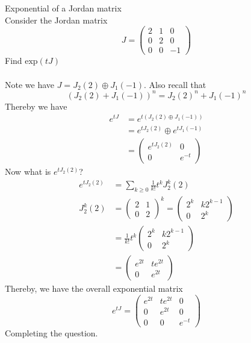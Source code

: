 \documentclass[journal, letterpaper]{IEEEtran}
\begin{document}
    \begin{myboxg}{Exponential of a Jordan matrix} \\ 
        Consider the Jordan matrix
        $$ J = \begin{pmatrix}
            2 & 1 & 0 \\
            0 & 2 & 0 \\
            0 & 0 & -1
        \end{pmatrix}$$
        Find $\text{exp}(tJ)$ \\ \\ 
        Note we have $J = J_2(2) \oplus J_1(-1)$. Also recall that
        $$ (J_2(2) + J_1(-1))^n = J_2(2)^n + J_1(-1)^n$$
        Thereby we have
        \begin{align*}
            e^{tJ} &= e^{t(J_2(2) \oplus J_1(-1))} \\
            &= e^{tJ_2(2)} \oplus e^{tJ_1(-1)} \\ 
            &= \begin{pmatrix}
                e^{tJ_2(2)} & 0 \\ 
                0 & e^{-t}
            \end{pmatrix}
        \end{align*}
        Now what is $e^{tJ_2(2)}$? 
        \begin{align*}
            e^{tJ_2(2)} &= \sum_{k \ge 0} \frac{1}{k!} t^k J_2^k(2) \\ 
            J_2^k(2) &= \begin{pmatrix}
                2 & 1 \\ 0 & 2
            \end{pmatrix}^k = \begin{pmatrix}
                2^k & k2^{k-1} \\ 0 & 2^k
            \end{pmatrix} \\ 
            &= \frac{1}{k!}t^k\begin{pmatrix}
                2^k & k2^{k-1} \\ 0 & 2^k 
            \end{pmatrix} \\ 
            &= \begin{pmatrix}
                e^{2t} & te^{2t} \\ 0 & e^{2t}
            \end{pmatrix}
        \end{align*}
        Thereby, we have the overall exponential matrix
        $$ e^{tJ} = \begin{pmatrix}
            e^{2t} & te^{2t} & 0 \\ 0 & e^{2t} & 0 \\ 0 & 0 & e^{-t}
        \end{pmatrix}$$
        Completing the question.
    \end{myboxg}
\end{document}
